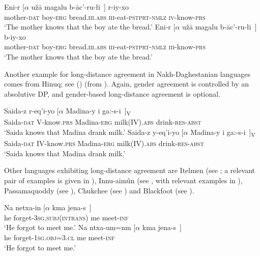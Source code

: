\documentclass[output=paper
,modfonts
,nonflat]{langsci/langscibook}
\begin{document}
\ea\label{ex:mueller:2}
\ea
\gll     Eni-r [$\alpha$ u\v{z}\={a} magalu b-\={a}c'-ru-\l i~] r-iy-xo \\
         mother-{\scshape dat} {} boy-{\scshape erg} bread.{\scshape iii.abs} {\scshape iii}-eat-{\scshape pstprt-nmlz} {\scshape iv}-know-{\scshape prs} \\
\glt     `The mother knows that the boy ate the bread.'
\ex
\gll     Eni-r [$\alpha$ u\v{z}\={a} \label{2-b}magalu b-\={a}c'-ru-\l i~] b-iy-xo \\
         mother-{\scshape dat} {} boy-{\scshape erg} bread.{\scshape iii.abs} {\scshape iii}-eat-{\scshape pstprt-nmlz} {\scshape iii}-know-{\scshape prs} \\
\glt      `The mother knows that the boy ate the bread.'
\z
\z

Another example for long-distance agreement in Nakh-Daghestanian
languages comes from Hinuq; see (\Next[a--b]) (from
\cite{Forker:11}). Again, gender agreement is controlled by an
absolutive DP, and gender-based long-distance agreement is optional.

\ea\label{ex:mueller:3}
\ea
\gll Sa\textbarglotstop ida-z r-eq'i-yo [$\alpha$ Madina-y \textgamma i ga:-s-\textbeltl i~]\textsubscript{V} \\
     Saida-{\scshape dat} {V}-know.{\scshape prs} {} Madina-{\scshape erg} milk(IV).{\scshape abs} drink-{\scshape res-abst} \\ 
\glt `Saida knows that Madina drank milk.'
\ex
\gll  Sa\textbarglotstop ida-z y-eq'i-yo [$\alpha$ \label{3-b}Madina-y \textgamma i ga:-s-\textbeltl i~]\textsubscript{V} \\
      Saida-{\scshape dat} {IV}-know.{\scshape prs} {} Madina-{\scshape erg} milk({IV}).{\scshape abs} drink-{\scshape res-abst} \\
\glt  `Saida knows that Madina drank milk.'
\z
\z

Other languages exhibiting long-distance agreement are Itelmen (see
\cite{Bobaljik&Wurmbrand:05}; a relevant pair of examples is given in
\Next), Innu-aim\^{u}n (see \cite{Branigan&MacKenzie:02}, with
relevant examples in \NNext), Passamaquoddy (see \cite{Bruening:01}),
Chukchee (see \cite{Boskovic:07}) and Blackfoot (see \cite{Bliss:09}).

\ea\label{ex:mueller:4}
\ea 
\gll Na netxa-in [$\alpha$ kma jena-s~] \\
     he forget-{{\scshape 3sg.subj(intrans)}} {} me meet-{\scshape inf} \\
\glt  `He forgot to meet me.'
\ex
\gll Na ntxa-um=nm [$\alpha$ kma jena-s~] \\
     he forget-{{\scshape 1sg.obj=3.cl}} {} {me} meet-{\scshape inf} \\
\glt `He forgot to meet me.'
\z
\z
\end{document}
